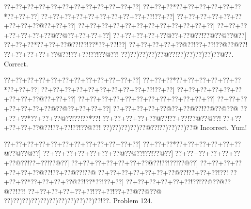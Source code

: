 \documentclass[a5paper]{article}
\begin{document}
\begin{center}
{\goo
\0??+\0??+\0??+\0??+\0??+\0??+\0??+\0??+\0??+\0??+\0??+\0??]
\0??+\0??+\0??*\0??+\0??+\0??+\0??+\0??+\0??*\0??+\0??+\0??]
\0??+\0??+\0??+\0??+\0??+\0??+\0??+\0??+\0??+\0??!\0??+\0??]
\0??+\0??+\0??+\0??+\0??+\0??+\0??+\0??+\0??@\0??+\0??+\0??]
\0??+\0??+\0??+\0??+\0??+\0??+\0??+\0??+\0??+\0??+\0??+\0??]
\0??+\0??+\0??+\0??+\0??+\0??+\0??@\0??@\0??+\0??+\0??+\0??]
\0??+\0??+\0??+\0??+\0??@\0??+\0??@\0??!\0??@\0??@\0??@\0??]
\0??+\0??+\0??*\0??+\0??+\0??@\0??!\0??!\0??*\0??+\0??!\0??]
\0??+\0??+\0??+\0??+\0??@\0??!\0??+\0??!\0??@\0??@\0??!
\0??+\0??+\0??+\0??+\0??@\0??!\0??+\0??!\0??!\0??@\0??!
\0??)\0??)\0??)\0??)\0??@\0??!\0??)\0??)\0??)\0??)\0??@\0??.
}
Correct. 

\end{center}
\begin{center}
{\goo
\0??+\0??+\0??+\0??+\0??+\0??+\0??+\0??+\0??+\0??+\0??+\0??]
\0??+\0??+\0??*\0??+\0??+\0??+\0??+\0??+\0??*\0??+\0??+\0??]
\0??+\0??+\0??+\0??+\0??+\0??+\0??+\0??+\0??+\0??!\0??+\0??]
\0??+\0??+\0??+\0??+\0??+\0??+\0??+\0??+\0??@\0??+\0??+\0??]
\0??+\0??+\0??+\0??+\0??+\0??+\0??+\0??+\0??+\0??+\0??+\0??]
\0??+\0??+\0??+\0??+\0??+\0??+\0??@\0??@\0??+\0??+\0??+\0??]
\0??+\0??+\0??+\0??+\0??@\0??+\0??@\0??!\0??@\0??@\0??@
\0??+\0??+\0??*\0??+\0??+\0??@\0??!\0??!\0??*\0??!
\0??+\0??+\0??+\0??+\0??@\0??!\0??+\0??!\0??@\0??@\0??!
\0??+\0??+\0??+\0??+\0??@\0??!\0??+\0??!\0??!\0??@\0??!
\0??)\0??)\0??)\0??)\0??@\0??!\0??)\0??)\0??)\0??@
}
Incorrect. Yum!

\end{center}
\newpage
\begin{center}
{\goo
\0??+\0??+\0??+\0??+\0??+\0??+\0??+\0??+\0??+\0??+\0??+\0??]
\0??+\0??+\0??*\0??+\0??+\0??+\0??+\0??+\0??@\0??@\0??@\0??]
\0??+\0??+\0??+\0??+\0??+\0??+\0??@\0??@\0??!\0??!\0??@\0??]
\0??+\0??+\0??+\0??+\0??+\0??+\0??@\0??!\0??+\0??!\0??@\0??]
\0??+\0??+\0??+\0??+\0??+\0??+\0??@\0??!\0??!\0??!\0??@\0??]
\0??+\0??+\0??+\0??+\0??+\0??+\0??@\0??!\0??+\0??@\0??!\0??@
\0??+\0??+\0??+\0??+\0??+\0??+\0??@\0??!\0??+\0??+\0??!\0??!
\0??+\0??+\0??*\0??+\0??+\0??+\0??@\0??!\0??*\0??!\0??+\0??]
\0??+\0??+\0??+\0??+\0??+\0??!\0??!\0??@\0??@\0??@\0??!\0??!
\0??+\0??+\0??+\0??+\0??+\0??!\0??+\0??!\0??+\0??@\0??@\0??@
\0??)\0??)\0??)\0??)\0??)\0??)\0??)\0??)\0??)\0??)\0??!\0??.
}
Problem 124.

\end{center}
\end{document}
